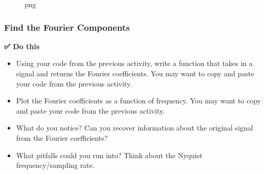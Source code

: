 \begin{figure}
\centering
{}
\caption{png}
\end{figure}

\subsubsection{Find the Fourier
Components}\label{find-the-fourier-components}

\textbf{✅ Do this}

\begin{itemize}
\tightlist
\item
  Using your code from the previous activity, write a function that
  takes in a signal and returns the Fourier coefficients. You may want
  to copy and paste your code from the previous activity.
\item
  Plot the Fourier coefficients as a function of frequency. You may want
  to copy and paste your code from the previous activity.
\item
  What do you notice? Can you recover information about the original
  signal from the Fourier coefficients?
\item
  What pitfalls could you run into? Think about the Nyquist
  frequency/sampling rate.
\end{itemize}

\begin{Shaded}
\begin{Highlighting}[]
\end{Highlighting}
\end{Shaded}
